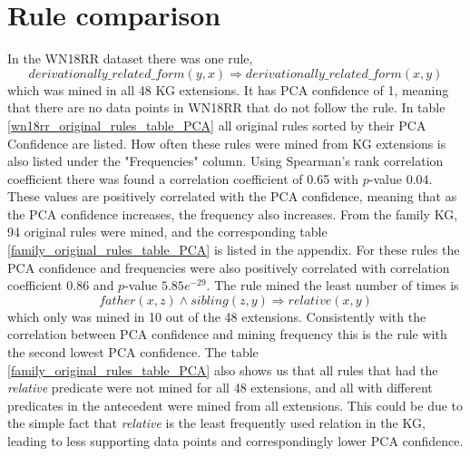 \newpage
\section{Rule comparison}
In the WN18RR dataset there was one rule, 
\[derivationally\_related\_form(y, x) \Rightarrow derivationally\_related\_form(x, y)\]
which was mined in all 48 KG extensions. It has PCA confidence of 1, meaning that there are no data points in WN18RR that do not follow the rule. In table \ref{wn18rr_original_rules_table_PCA} all original rules sorted by their PCA Confidence are listed. How often these rules were mined from KG extensions is also listed under the "Frequencies" column. Using Spearman's rank correlation coefficient there was found a correlation coefficient of 0.65 with $p$-value 0.04. These values are positively correlated with the PCA confidence, meaning that as the PCA confidence increases, the frequency also increases. From the family KG, 94 original rules were mined, and the corresponding table \ref{family_original_rules_table_PCA} is listed in the appendix. For these rules the PCA confidence and frequencies were also positively correlated with correlation coefficient 0.86 and $p$-value $5.85e^{-29}$. The rule mined the least number of times is
\[father(x,z) \wedge sibling(z, y) \Rightarrow relative(x, y)\]
which only was mined in 10 out of the 48 extensions. Consistently with the correlation between PCA confidence and mining frequency this is the rule with the second lowest PCA confidence. The table \ref{family_original_rules_table_PCA} also shows us that all rules that had the \textit{relative} predicate were not mined for all 48 extensions, and all with different predicates in the antecedent were mined from all extensions. This could be due to the simple fact that \textit{relative} is the least frequently used relation in the KG, leading to less supporting data points and correspondingly lower PCA confidence.




